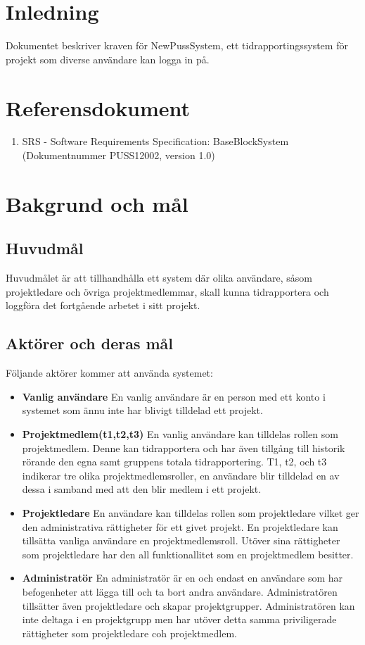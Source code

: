 \documentclass[a4paper]{article}
\begin{document}
\section{Inledning}       
Dokumentet beskriver kraven för NewPussSystem, ett tidrapportingssystem för projekt som diverse användare kan logga in på.

\section{Referensdokument}
\begin{enumerate}
\item SRS - Software Requirements Specification: BaseBlockSystem (Dokumentnummer PUSS12002, version 1.0)
\end{enumerate}
\section{Bakgrund och mål}   
\subsection{Huvudmål}
Huvudmålet är att tillhandhålla ett system där olika användare, såsom projektledare och övriga projektmedlemmar, skall kunna tidrapportera och loggföra det fortgående arbetet i sitt projekt. 

\subsection{Aktörer och deras mål}
\label{bom-aktorer}
Följande aktörer kommer att använda systemet:
\begin{itemize}
\item [] \textbf{Vanlig användare} En vanlig användare är en person med ett konto i systemet som ännu inte har blivigt tilldelad ett projekt.
\item [] \textbf{Projektmedlem(t1,t2,t3)} En vanlig användare kan tilldelas rollen som projektmedlem. Denne kan tidrapportera och har även tillgång till historik rörande den egna samt gruppens totala tidrapportering. T1, t2, och t3 indikerar tre olika projektmedlemsroller, en användare blir tilldelad en av dessa i samband med att den blir medlem i ett projekt.
\item [] \textbf{Projektledare} En användare kan tilldelas rollen som projektledare vilket ger den administrativa rättigheter för ett givet projekt. En projektledare kan tillsätta vanliga användare en projektmedlemsroll. Utöver sina rättigheter som projektledare har den all funktionallitet som en projektmedlem besitter.
\item [] \textbf{Administratör} En administratör är en och endast en användare som har befogenheter att lägga till och ta bort andra användare. Administratören tillsätter även projektledare och skapar projektgrupper. Administratören kan inte deltaga i en projektgrupp men har utöver detta samma priviligerade rättigheter som projektledare coh projektmedlem.
\end{itemize}
\end{document}
